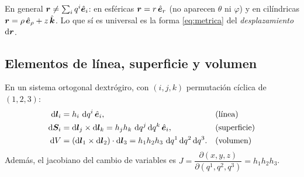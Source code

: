 \begin{observacion}
En general $\bm{r}\neq\sum_{i}q^{i}\hat{\bm{e}}_{i}$: en esféricas
$\bm{r}=r\,\hat{\bm{e}}_{r}$ (no aparecen $\theta$ ni $\varphi$) y en cilíndricas
$\bm{r}=\rho\,\hat{\bm{e}}_{\rho}+z\,\hat{\bm{k}}$. Lo que sí es universal es la forma
\eqref{eq:metrica} del \emph{desplazamiento} $\mathop{}\!\mathrm{d}\bm{r}$.
\end{observacion}

\subsection{Elementos de línea, superficie y volumen}

\begin{proposicion}
\label{prop:elementos}
En un sistema ortogonal dextrógiro, con $(i,j,k)$ permutación cíclica de
$(1,2,3)$:
\begin{align}
  \dd\vb{l}_{i}&=h_{i}\,\dd q^{i}\,\uv{e}_{i},
  &&\text{(línea)}\label{eq:dl}\\
  \dd\vb{S}_{i}&=\dd\vb{l}_{j}\times\dd\vb{l}_{k}=h_{j}h_{k}\,\dd q^{j}\dd q^{k}\,\uv{e}_{i},
  &&\text{(superficie)}\label{eq:dS}\\
  \dd V&=(\dd\vb{l}_{1}\times\dd\vb{l}_{2})\cdot\dd\vb{l}_{3}=h_{1}h_{2}h_{3}\,\dd q^{1}\dd q^{2}\dd q^{3}.
  &&\text{(volumen)}\label{eq:dV}
\end{align}
Además, el jacobiano del cambio de variables es
$J=\dfrac{\partial(x,y,z)}{\partial(q^{1},q^{2},q^{3})}=h_{1}h_{2}h_{3}$.
\end{proposicion}

